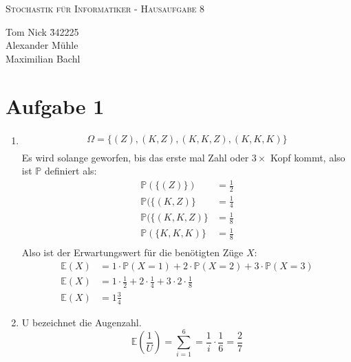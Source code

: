 \documentclass[10pt,a4paper,parskip=half]{scrartcl}
\newcommand{\PP}{\mathbb{P}}
\newcommand{\E}{\mathbb{E}}
\begin{document}
\begin{center}
\textsc{\Large{Stochastik für Informatiker - Hausaufgabe 8}} \\
\end{center}
\begin{tabbing}
Tom Nick \hspace{1.4cm}\= 342225\\
Alexander Mühle\\
Maximilian Bachl
\end{tabbing}
\section*{Aufgabe 1}
\begin{enumerate}
\item \begin{align*}
\Omega = \{(Z), (K, Z), (K, K, Z) , (K, K, K)\} \\
\end{align*}
Es wird solange geworfen, bis das erste mal Zahl oder $3\times$ Kopf kommt, also ist $\PP$ definiert als:
\begin{align*}
\PP(\{(Z)\}) &= \frac{1}{2} \\
\PP(\{(K, Z)\} &= \frac{1}{4} \\
\PP(\{(K, K, Z)\} &= \frac{1}{8} \\
\PP(\{K,K,K)\} &= \frac{1}{8} \\
\end{align*}
Also ist der Erwartungswert für die benötigten Züge $X$:
\begin{align*}
\E(X) &= 1 \cdot \PP(X = 1) + 2\cdot\PP(X=2)+3\cdot\PP(X=3) \\
\E(X) &= 1 \cdot \frac{1}{2} + 2\cdot \frac{1}{4} + 3 \cdot 2 \cdot \frac{1}{8} \\
\E(X) &= 1 \frac{3}{4}
\end{align*}
\item U bezeichnet die Augenzahl.
$$\E(\frac{1}{U}) = \sum_{i=1}^{6} = \frac{1}{i} \cdot \frac{1}{6} = \frac{2}{7} $$
\end{enumerate}
\end{document}
